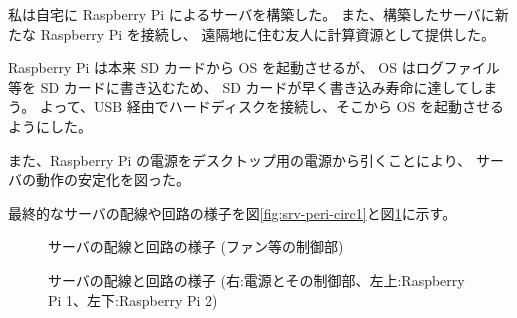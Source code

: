 \def \wrkdir {p.server/}

\label{pa:server}

私は自宅に Raspberry Pi によるサーバを構築した。
また、構築したサーバに新たな Raspberry Pi を接続し、
遠隔地に住む友人に計算資源として提供した。

Raspberry Pi は本来 SD カードから OS を起動させるが、
OS はログファイル等を SD カードに書き込むため、
SD カードが早く書き込み寿命に達してしまう。
よって、USB 経由でハードディスクを接続し、そこから OS を起動させるようにした。

また、Raspberry Pi の電源をデスクトップ用の電源から引くことにより、
サーバの動作の安定化を図った。

最終的なサーバの配線や回路の様子を図\ref{fig:srv-peri-circ1}と図\ref{fig:srv-peri-circ2}に示す。

\begin{figure}[H]
\centering
\begin{minipage}{0.45\linewidth}
\caption{サーバの配線と回路の様子 (ファン等の制御部)}
\label{fig:srv-peri-circ1}
\end{minipage}
\begin{minipage}{0.45\linewidth}
\caption{サーバの配線と回路の様子 (右:電源とその制御部、左上:Raspberry Pi 1、左下:Raspberry Pi 2)}
\label{fig:srv-peri-circ2}
\end{minipage}
\end{figure}
